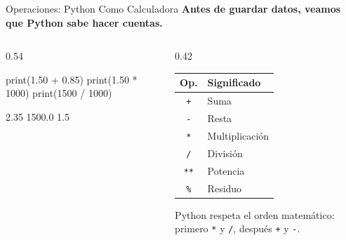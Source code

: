 \documentclass[aspectratio=169, 11pt]{beamer}
\begin{document}
\begin{frame}[fragile]{Operaciones: Python Como Calculadora}
  \vspace{-6pt}
  {\small\color{arcaDark}\bfseries
    Antes de guardar datos, veamos que Python sabe hacer cuentas.}

  \vspace{4pt}
  \begin{columns}[T]
    \begin{column}{0.54\textwidth}
      \begin{pyblock}
print(1.50 + 0.85)
print(1.50 * 1000)
print(1500 / 1000)
      \end{pyblock}
      \vspace{-2pt}
      \begin{outputblock}
2.35
1500.0
1.5
      \end{outputblock}
    \end{column}

    \begin{column}{0.42\textwidth}
      {\footnotesize
      \renewcommand{\arraystretch}{1.3}
      \begin{tabular}{@{}c l@{}}
        \toprule
        {\bfseries\color{arcaRed} Op.} & {\bfseries\color{arcaDark} Significado} \\
        \midrule
        \texttt{+} & Suma \\
        \texttt{-} & Resta \\
        \texttt{*} & Multiplicación \\
        \texttt{/} & División \\
        \texttt{**} & Potencia \\
        \texttt{\%} & Residuo \\
        \bottomrule
      \end{tabular}
      }

      \vspace{4pt}
      {\scriptsize\color{textMuted}
        Python respeta el orden matemático:
        primero \texttt{*} y \texttt{/},
        después \texttt{+} y \texttt{-}.}
    \end{column}
  \end{columns}
\end{frame}
\end{document}
